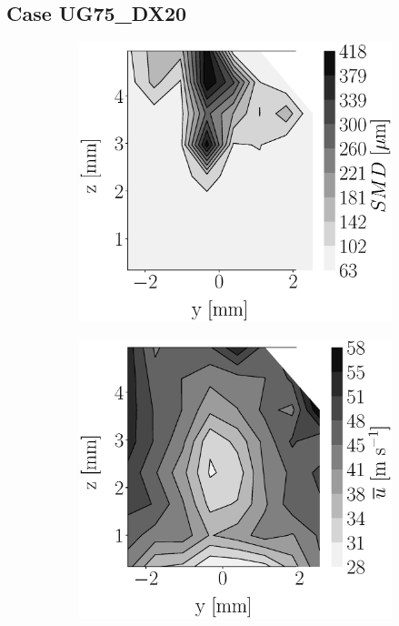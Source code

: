 \clearpage

\subsection{Case UG75\_DX20}





\begin{figure}[h!]
\flushleft
\begin{subfigure}[b]{0.22\textwidth}
	\centering
   \includegraphics[scale=0.17]{./part2_developments/figures_ch5_resolved_JICF/injectors_SLI/uG75_dx20_x05_SMD_map.eps}
\end{subfigure}
   \hspace{0.17in}
\begin{subfigure}[b]{0.22\textwidth}
	\centering
   \includegraphics[scale=0.17]{./part2_developments/figures_ch5_resolved_JICF/injectors_SLI/uG75_dx20_x05_ux_mean_map.eps}

\end{subfigure}
\end{figure}
